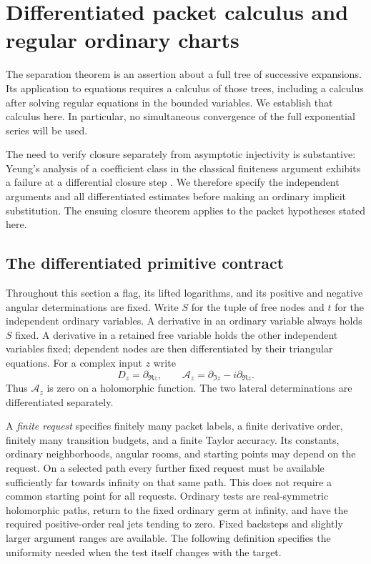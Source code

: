 \section{Differentiated packet calculus and regular ordinary charts}
\label{sec:calculus}

The separation theorem is an assertion about a full tree of successive
expansions.  Its application to equations requires a calculus of those trees,
including a calculus after solving regular equations in the bounded
variables.  We establish that calculus here.  In particular, no simultaneous
convergence of the full exponential series will be used.

The need to verify closure separately from asymptotic injectivity is
substantive: Yeung's analysis of a coefficient class in the classical
finiteness argument exhibits a failure at a differential closure step
\citep{Yeung2025}. We therefore specify the independent arguments and
all differentiated estimates before making an ordinary implicit
substitution. The ensuing closure theorem applies to the packet
hypotheses stated here.

\subsection{The differentiated primitive contract}

Throughout this section a flag, its lifted logarithms, and its positive and
negative angular determinations are fixed.  Write $S$ for the tuple of free
nodes and $t$ for the independent ordinary variables.  A derivative in an
ordinary variable always holds $S$ fixed.  A derivative in a retained free
variable holds the other independent variables fixed; dependent nodes are
then differentiated by their triangular equations.  For a complex input $z$
write
\[
 D_z=\partial_{\Re z},\qquad
 \mathcal A_z=\partial_{\Im z}-i\partial_{\Re z}.
\]
Thus $\mathcal A_z$ is zero on a holomorphic function.  The two lateral
determinations are differentiated separately.

A \emph{finite request} specifies finitely many packet labels, a finite
derivative order, finitely many transition budgets, and a finite Taylor
accuracy.  Its constants, ordinary neighborhoods, angular rooms, and starting
points may depend on the request.  On a selected path every further fixed
request must be available sufficiently far towards infinity on that same
path.  This does not require a common starting point for all requests.
Ordinary tests are real-symmetric holomorphic paths, return to the fixed
ordinary germ at infinity, and have the required positive-order real jets
tending to zero.  Fixed backsteps and slightly larger argument ranges are
available.  The following definition specifies the uniformity needed when
the test itself changes with the target.

